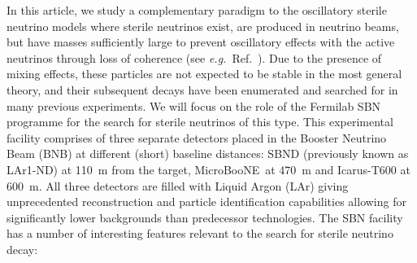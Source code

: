 \documentclass[11pt, a4paper]{article}
\newcommand{\refref}[1]{Ref.~\cite{#1}}
\def\eg{\emph{e.g.}}
\def\muboone{MicroBooNE}
\newcommand{\newtext}[2]{\textcolor{#1}{\ul{#2}}}
\begin{document}
In this article, we study a complementary paradigm to the oscillatory sterile
neutrino models where sterile neutrinos exist, are produced in neutrino beams,
but have masses sufficiently large to prevent oscillatory effects with the
active neutrinos through loss of coherence (see \eg\ \refref{Akhmedov:2009rb}).
Due to the presence of mixing effects, these particles are not expected to be
stable in the most general theory, and their subsequent decays have been
enumerated \cite{Atre:2009rg} and searched for in many previous experiments.
%
We will focus on the role of the Fermilab SBN programme
\cite{Antonello:2015lea} for the search for sterile neutrinos of this type.
%
This experimental facility comprises of three separate detectors placed in the
Booster Neutrino Beam (BNB) at different (short) baseline distances: SBND
(previously known as LAr1-ND) at 110~m from the target, \muboone\ at 470~m and
Icarus-T600 at 600~m.  All three detectors are filled with Liquid Argon (LAr)
giving unprecedented reconstruction and particle identification capabilities
allowing for significantly lower backgrounds than predecessor technologies. 
%
%
The SBN facility has a number of interesting features relevant to the 
search for sterile neutrino decay:
\end{document}
